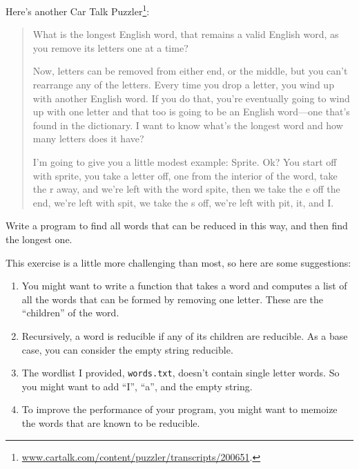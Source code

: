 \documentclass[10pt]{book}
\begin{document}
\begin{ex}


Here's another Car Talk Puzzler\footnote{
\url{www.cartalk.com/content/puzzler/transcripts/200651}.}:

\begin{quote}
What is the longest English word, that remains a valid English word,
as you remove its letters one at a time?

Now, letters can be removed from either end, or the middle, but you
can't rearrange any of the letters. Every time you drop a letter, you
wind up with another English word. If you do that, you're eventually
going to wind up with one letter and that too is going to be an
English word---one that's found in the dictionary. I want to know
what's the longest word and how many letters does it
have?

I'm going to give you a little modest example: Sprite. Ok? You start
off with sprite, you take a letter off, one from the interior of the
word, take the r away, and we're left with the word spite, then we
take the e off the end, we're left with spit, we take the s off, we're
left with pit, it, and I.
\end{quote}


Write a program to find all words that can be reduced in this way,
and then find the longest one.

This exercise is a little more challenging than most, so here are
some suggestions:

\begin{enumerate}

\item You might want to write a function that takes a word and
  computes a list of all the words that can be formed by removing one
  letter.  These are the ``children'' of the word.


\item Recursively, a word is reducible if any of its children
are reducible.  As a base case, you can consider the empty
string reducible.

\item The wordlist I provided, {\tt words.txt}, doesn't
contain single letter words.  So you might want to add
``I'', ``a'', and the empty string.

\item To improve the performance of your program, you might want
to memoize the words that are known to be reducible.

\end{enumerate}

% 
\end{ex}
\end{document}
